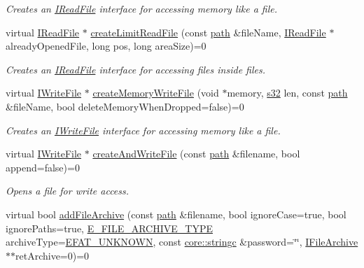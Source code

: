\begin{DoxyCompactItemize}
\begin{DoxyCompactList}\small\item\em Creates an \hyperlink{classirr_1_1io_1_1IReadFile}{I\+Read\+File} interface for accessing memory like a file. \end{DoxyCompactList}\item 
virtual \hyperlink{classirr_1_1io_1_1IReadFile}{I\+Read\+File} $\ast$ \hyperlink{classirr_1_1io_1_1IFileSystem_a8b110f1ed6f52098753b7a558c020dbc}{create\+Limit\+Read\+File} (const \hyperlink{namespaceirr_1_1io_a6468281622ce3a1c46b72e19f32dded5}{path} \&file\+Name, \hyperlink{classirr_1_1io_1_1IReadFile}{I\+Read\+File} $\ast$already\+Opened\+File, long pos, long area\+Size)=0
\begin{DoxyCompactList}\small\item\em Creates an \hyperlink{classirr_1_1io_1_1IReadFile}{I\+Read\+File} interface for accessing files inside files. \end{DoxyCompactList}\item 
virtual \hyperlink{classirr_1_1io_1_1IWriteFile}{I\+Write\+File} $\ast$ \hyperlink{classirr_1_1io_1_1IFileSystem_a568dd1e737fe3d3222b2e4ca2b6ebad3}{create\+Memory\+Write\+File} (void $\ast$memory, \hyperlink{namespaceirr_ac66849b7a6ed16e30ebede579f9b47c6}{s32} len, const \hyperlink{namespaceirr_1_1io_a6468281622ce3a1c46b72e19f32dded5}{path} \&file\+Name, bool delete\+Memory\+When\+Dropped=false)=0
\begin{DoxyCompactList}\small\item\em Creates an \hyperlink{classirr_1_1io_1_1IWriteFile}{I\+Write\+File} interface for accessing memory like a file. \end{DoxyCompactList}\item 
virtual \hyperlink{classirr_1_1io_1_1IWriteFile}{I\+Write\+File} $\ast$ \hyperlink{classirr_1_1io_1_1IFileSystem_af0ed28b697936ee8aa60a5a0877ac90a}{create\+And\+Write\+File} (const \hyperlink{namespaceirr_1_1io_a6468281622ce3a1c46b72e19f32dded5}{path} \&filename, bool append=false)=0
\begin{DoxyCompactList}\small\item\em Opens a file for write access. \end{DoxyCompactList}\item 
virtual bool \hyperlink{classirr_1_1io_1_1IFileSystem_afe6641c7f88a8fea0205c113b8379730}{add\+File\+Archive} (const \hyperlink{namespaceirr_1_1io_a6468281622ce3a1c46b72e19f32dded5}{path} \&filename, bool ignore\+Case=true, bool ignore\+Paths=true, \hyperlink{namespaceirr_1_1io_adb3e3c445ec8e608ed1f0f93306da14f}{E\+\_\+\+F\+I\+L\+E\+\_\+\+A\+R\+C\+H\+I\+V\+E\+\_\+\+T\+Y\+PE} archive\+Type=\hyperlink{namespaceirr_1_1io_adb3e3c445ec8e608ed1f0f93306da14fa7a4f7d9873f9705cd6dc73191e7d8359}{E\+F\+A\+T\+\_\+\+U\+N\+K\+N\+O\+WN}, const \hyperlink{namespaceirr_1_1core_ab26a0e0359206b5a694f35c37c829d7f}{core\+::stringc} \&password=\char`\"{}\char`\"{}, \hyperlink{classirr_1_1io_1_1IFileArchive}{I\+File\+Archive} $\ast$$\ast$ret\+Archive=0)=0
$$
\end{DoxyCompactItemize}
